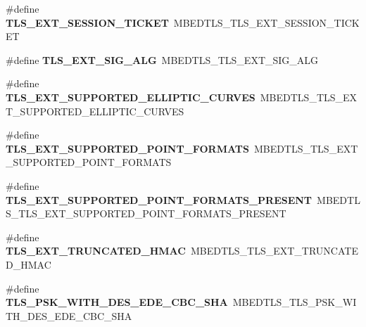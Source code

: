 \begin{DoxyCompactItemize}
\item 
\mbox{\label{compat-1_83_8h_aef2d649998ef071cfa04c072ebd30909}} 
\#define {\bfseries T\+L\+S\+\_\+\+E\+X\+T\+\_\+\+S\+E\+S\+S\+I\+O\+N\+\_\+\+T\+I\+C\+K\+ET}~M\+B\+E\+D\+T\+L\+S\+\_\+\+T\+L\+S\+\_\+\+E\+X\+T\+\_\+\+S\+E\+S\+S\+I\+O\+N\+\_\+\+T\+I\+C\+K\+ET
\item 
\mbox{\label{compat-1_83_8h_a03991596f1740bf164b513d6e43c1f4c}} 
\#define {\bfseries T\+L\+S\+\_\+\+E\+X\+T\+\_\+\+S\+I\+G\+\_\+\+A\+LG}~M\+B\+E\+D\+T\+L\+S\+\_\+\+T\+L\+S\+\_\+\+E\+X\+T\+\_\+\+S\+I\+G\+\_\+\+A\+LG
\item 
\mbox{\label{compat-1_83_8h_a5027dcb3f9e79d66d008105a6a10b88b}} 
\#define {\bfseries T\+L\+S\+\_\+\+E\+X\+T\+\_\+\+S\+U\+P\+P\+O\+R\+T\+E\+D\+\_\+\+E\+L\+L\+I\+P\+T\+I\+C\+\_\+\+C\+U\+R\+V\+ES}~M\+B\+E\+D\+T\+L\+S\+\_\+\+T\+L\+S\+\_\+\+E\+X\+T\+\_\+\+S\+U\+P\+P\+O\+R\+T\+E\+D\+\_\+\+E\+L\+L\+I\+P\+T\+I\+C\+\_\+\+C\+U\+R\+V\+ES
\item 
\mbox{\label{compat-1_83_8h_af4c82017108e0645f315b12052e4c7b7}} 
\#define {\bfseries T\+L\+S\+\_\+\+E\+X\+T\+\_\+\+S\+U\+P\+P\+O\+R\+T\+E\+D\+\_\+\+P\+O\+I\+N\+T\+\_\+\+F\+O\+R\+M\+A\+TS}~M\+B\+E\+D\+T\+L\+S\+\_\+\+T\+L\+S\+\_\+\+E\+X\+T\+\_\+\+S\+U\+P\+P\+O\+R\+T\+E\+D\+\_\+\+P\+O\+I\+N\+T\+\_\+\+F\+O\+R\+M\+A\+TS
\item 
\mbox{\label{compat-1_83_8h_a66091f70d8cfd5a5d43d42c221612567}} 
\#define {\bfseries T\+L\+S\+\_\+\+E\+X\+T\+\_\+\+S\+U\+P\+P\+O\+R\+T\+E\+D\+\_\+\+P\+O\+I\+N\+T\+\_\+\+F\+O\+R\+M\+A\+T\+S\+\_\+\+P\+R\+E\+S\+E\+NT}~M\+B\+E\+D\+T\+L\+S\+\_\+\+T\+L\+S\+\_\+\+E\+X\+T\+\_\+\+S\+U\+P\+P\+O\+R\+T\+E\+D\+\_\+\+P\+O\+I\+N\+T\+\_\+\+F\+O\+R\+M\+A\+T\+S\+\_\+\+P\+R\+E\+S\+E\+NT
\item 
\mbox{\label{compat-1_83_8h_a11832588d5c48b20e1cefbb1149823aa}} 
\#define {\bfseries T\+L\+S\+\_\+\+E\+X\+T\+\_\+\+T\+R\+U\+N\+C\+A\+T\+E\+D\+\_\+\+H\+M\+AC}~M\+B\+E\+D\+T\+L\+S\+\_\+\+T\+L\+S\+\_\+\+E\+X\+T\+\_\+\+T\+R\+U\+N\+C\+A\+T\+E\+D\+\_\+\+H\+M\+AC
\item 
\mbox{\label{compat-1_83_8h_a467b50d6801535ae3dbdacfaa265d9a3}} 
\#define {\bfseries T\+L\+S\+\_\+\+P\+S\+K\+\_\+\+W\+I\+T\+H\+\_\+D\+E\+S\+\_\+\+E\+D\+E\+\_\+\+C\+B\+C\+\_\+\+S\+HA}~M\+B\+E\+D\+T\+L\+S\+\_\+\+T\+L\+S\+\_\+\+P\+S\+K\+\_\+\+W\+I\+T\+H\+\_\+D\+E\+S\+\_\+\+E\+D\+E\+\_\+\+C\+B\+C\+\_\+\+S\+HA

\end{DoxyCompactItemize}
